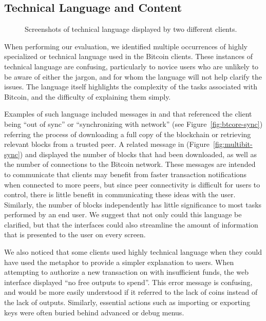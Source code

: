 \subsection{Technical Language and Content}
\begin{figure}[htb]
        \centering
                
        
        \caption{Screenshots of technical language displayed by two different clients. }\label{fig:techlang}
\end{figure}
%
When performing our evaluation, we identified multiple occurrences of highly specialized or technical language used in the Bitcoin clients. These instances of technical language are confusing, particularly to novice users who are unlikely to be aware of either the jargon, and for whom the language will not help clarify the issues. The language itself highlights the complexity of the tasks associated with Bitcoin, and the difficulty of explaining them simply.

Examples of such language included messages in \multibit and  \bitcoinclient that referenced the client being ``out of sync'' or ``synchronizing with network'' (see Figure~\ref{fig:btcore-sync}) referring the process of downloading a full copy of the blockchain or retrieving relevant blocks from a trusted peer. A related message in \multibit (Figure~\ref{fig:multibit-sync}) and \armory displayed the number of blocks that had been downloaded, as well as the number of connections to the Bitcoin network. These messages are intended to communicate that clients may benefit from faster transaction notifications when connected to more peers, but since peer connectivity is difficult for users to control, there is little benefit in communicating these ideas with the user. Similarly, the number of blocks independently has little significance to most tasks performed by an end user. We suggest that not only could this language be clarified, but that the interfaces could also streamline the amount of information that is presented to the user on every screen.

We also noticed that some clients used highly technical language when they could have used the metaphor to provide a simpler explanation to users. When attempting to authorize a new transaction on \block with insufficient funds, the web interface displayed ``no free outputs to spend''. This error message is confusing, and would be more easily understood if it referred to the lack of coins instead of the lack of outputs. Similarly, essential actions such as importing or exporting keys were often buried behind advanced or debug menus. 


